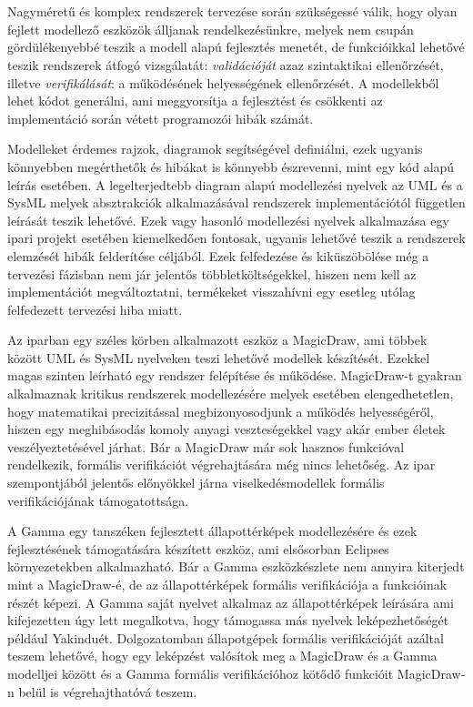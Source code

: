 \chapter{\bevezetes}


Nagyméretű és komplex rendszerek tervezése során szükségessé válik, hogy olyan fejlett modellező eszközök álljanak rendelkezésünkre, melyek nem csupán gördülékenyebbé teszik a modell alapú fejlesztés menetét, de funkcióikkal lehetővé teszik rendszerek átfogó vizsgálatát: \emph{validációját} azaz szintaktikai ellenőrzését, illetve \emph{verifikálását}: a működésének helyességének ellenőrzését. A modellekből lehet kódot generálni, ami meggyorsítja a fejlesztést és csökkenti az implementáció során vétett programozói hibák számát.

Modelleket érdemes rajzok, diagramok segítségével definiálni, ezek ugyanis könnyebben megérthetők és hibákat is könnyebb észrevenni, mint egy kód alapú leírás esetében. A legelterjedtebb diagram alapú modellezési nyelvek az UML és a SysML melyek absztrakciók alkalmazásával rendszerek implementációtól független leírását teszik lehetővé. Ezek vagy hasonló modellezési nyelvek alkalmazása egy ipari projekt esetében kiemelkedően fontosak, ugyanis lehetővé teszik a rendszerek elemzését hibák felderítése céljából. Ezek felfedezése és kiküszöbölése még a tervezési fázisban nem jár jelentős többletköltségekkel, hiszen nem kell az implementációt megváltoztatni, termékeket visszahívni egy esetleg utólag felfedezett tervezési hiba miatt.

Az iparban egy széles körben alkalmazott eszköz a MagicDraw, ami többek között UML és SysML nyelveken teszi lehetővé modellek készítését. Ezekkel magas szinten leírható egy rendszer felépítése és működése. MagicDraw-t gyakran alkalmaznak kritikus rendszerek modellezésére melyek esetében elengedhetetlen, hogy matematikai precizitással megbizonyosodjunk a működés helyességéről, hiszen egy meghibásodás komoly anyagi veszteségekkel vagy akár ember életek veszélyeztetésével járhat. Bár a MagicDraw már sok hasznos funkcióval rendelkezik, formális verifikációt végrehajtására még nincs lehetőség. Az ipar szempontjából jelentős előnyökkel járna viselkedésmodellek formális verifikációjának támogatottsága.

A Gamma egy tanszéken fejlesztett állapottérképek modellezésére és ezek fejlesztésének támogatására készített eszköz, ami elsősorban Eclipses környezetekben alkalmazható. Bár a Gamma eszközkészlete nem annyira kiterjedt mint a MagicDraw-é, de az állapottérképek formális verifikációja a funkcióinak részét képezi. A Gamma saját nyelvet alkalmaz az állapottérképek leírására ami kifejezetten úgy lett megalkotva, hogy támogassa más nyelvek leképezhetőségét például Yakinduét. Dolgozatomban állapotgépek formális verifikációját azáltal teszem lehetővé, hogy egy leképzést valósítok meg a MagicDraw és a Gamma modelljei között és a Gamma formális verifikációhoz kötődő funkcióit MagicDraw-n belül is végrehajthatóvá teszem.

